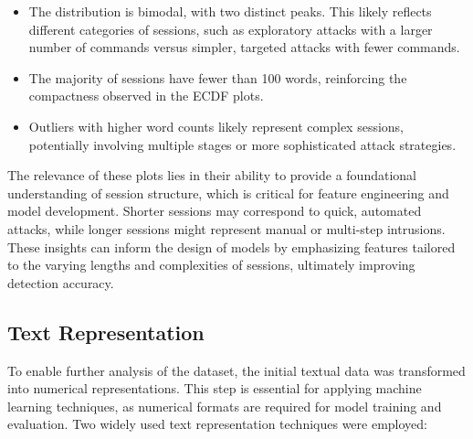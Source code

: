         \begin{itemize}
        
            \item The distribution is bimodal, with two distinct peaks. This likely reflects different categories of sessions, such as exploratory attacks with a larger number of commands versus simpler, targeted attacks with fewer commands.
            
            \vspace{0.2em}
            
            \item The majority of sessions have fewer than 100 words, reinforcing the compactness observed in the ECDF plots.
            
            \vspace{0.2em}
            
            \item Outliers with higher word counts likely represent complex sessions, potentially involving multiple stages or more sophisticated attack strategies.
            
        \end{itemize}

        The relevance of these plots lies in their ability to provide a foundational understanding of session structure, which is critical for feature engineering and model development. Shorter sessions may correspond to quick, automated attacks, while longer sessions might represent manual or multi-step intrusions. These insights can inform the design of models by emphasizing features tailored to the varying lengths and complexities of sessions, ultimately improving detection accuracy.

    \subsection{Text Representation}

        To enable further analysis of the dataset, the initial textual data was transformed into numerical representations. This step is essential for applying machine learning techniques, as numerical formats are required for model training and evaluation. Two widely used text representation techniques were employed:

